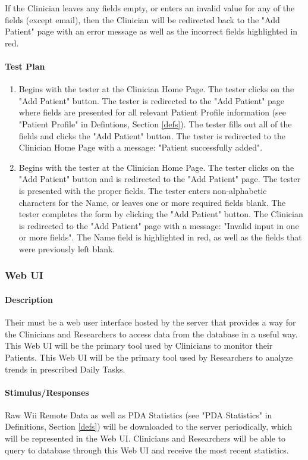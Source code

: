 \documentclass{article}
\begin{document}
If the Clinician leaves any fields empty, or enters an invalid value for any of the fields (except email), then the Clinician
will be redirected back to the "Add Patient" page with an error message as well as the incorrect fields highlighted in red.  

\paragraph {Test Plan}
\begin{enumerate}
\item Begins with the tester at the Clinician Home Page. The tester clicks on the "Add Patient" button. The tester is redirected to the "Add Patient" page where fields are presented for all relevant Patient Profile information (see "Patient Profile" in Defintions, Section \ref{defs}). The tester fills out all of the fields and clicks the "Add Patient" button. The tester is redirected to the Clinician Home Page with a message: "Patient successfully added".
\item Begins with the tester at the Clinician Home Page. The tester clicks on the "Add Patient" button and is redirected to the "Add Patient" page. The tester is presented with the proper fields. The tester enters non-alphabetic characters for the Name, or leaves one or more required fields blank. The tester completes the form by clicking the "Add Patient" button. The Clinician is redirected to the "Add Patient" page with a message: "Invalid input in one or more fields". The Name field is highlighted in red, as well as the fields that were previously left blank.
\end{enumerate}


\subsubsection {Web UI}\label{sec: Web UI}
\paragraph {Description}
Their must be a web user interface hosted by the server that provides a way for the Clinicians and Researchers to access data from the database in a useful way. This Web UI will be the primary tool used by Clinicians to monitor their Patients. This Web UI will be the primary tool used by Researchers to analyze trends in prescribed Daily Tasks.
\paragraph {Stimulus/Responses}
Raw Wii Remote Data as well as PDA Statistics (see "PDA Statistics" in Definitions, Section \ref{defs}) will be downloaded to the server periodically, which will be represented in the Web UI. Clinicians and Researchers will be able to query to database through this Web UI and receive the most recent statistics. 
\end{document}
